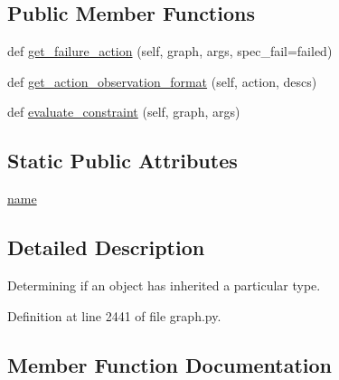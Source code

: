 \subsection*{Public Member Functions}
\begin{DoxyCompactItemize}
\item 
def \hyperlink{classlight__chats_1_1graph_1_1IsTypeConstraint_a0d16b081fd2f7d73ed7e0414cd518f1e}{get\+\_\+failure\+\_\+action} (self, graph, args, spec\+\_\+fail=\textquotesingle{}failed\textquotesingle{})
\item 
def \hyperlink{classlight__chats_1_1graph_1_1IsTypeConstraint_a1443cca8a343b530929093446b1b914f}{get\+\_\+action\+\_\+observation\+\_\+format} (self, action, descs)
\item 
def \hyperlink{classlight__chats_1_1graph_1_1IsTypeConstraint_aad886d877405c19204a37f2f7cf34db9}{evaluate\+\_\+constraint} (self, graph, args)
\end{DoxyCompactItemize}
\subsection*{Static Public Attributes}
\begin{DoxyCompactItemize}
\item 
\hyperlink{classlight__chats_1_1graph_1_1IsTypeConstraint_a1378fd0e57416b317a7754d3059a65ff}{name}
\end{DoxyCompactItemize}


\subsection{Detailed Description}
\begin{DoxyVerb}Determining if an object has inherited a particular type.
\end{DoxyVerb}
 

Definition at line 2441 of file graph.\+py.



\subsection{Member Function Documentation}
\mbox{\label{classlight__chats_1_1graph_1_1IsTypeConstraint_aad886d877405c19204a37f2f7cf34db9}} 
